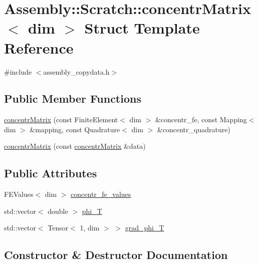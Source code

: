 \hypertarget{struct_assembly_1_1_scratch_1_1concentr_matrix}{}\section{Assembly\+:\+:Scratch\+:\+:concentr\+Matrix$<$ dim $>$ Struct Template Reference}
\label{struct_assembly_1_1_scratch_1_1concentr_matrix}


{\ttfamily \#include $<$assembly\+\_\+copydata.\+h$>$}

\subsection*{Public Member Functions}
\begin{DoxyCompactItemize}
\item 
\hyperlink{struct_assembly_1_1_scratch_1_1concentr_matrix_a09f4fe4a7e3f71ef4817e9a07b618473}{concentr\+Matrix} (const Finite\+Element$<$ dim $>$ \&concentr\+\_\+fe, const Mapping$<$ dim $>$ \&mapping, const Quadrature$<$ dim $>$ \&concentr\+\_\+quadrature)
\item 
\hyperlink{struct_assembly_1_1_scratch_1_1concentr_matrix_ae04f5cdc68467da262a5c29712790d24}{concentr\+Matrix} (const \hyperlink{struct_assembly_1_1_scratch_1_1concentr_matrix}{concentr\+Matrix} \&data)
\end{DoxyCompactItemize}
\subsection*{Public Attributes}
\begin{DoxyCompactItemize}
\item 
F\+E\+Values$<$ dim $>$ \hyperlink{struct_assembly_1_1_scratch_1_1concentr_matrix_ab33eea0fdd2716aa1aab80e22a3c3d1b}{concentr\+\_\+fe\+\_\+values}
\item 
std\+::vector$<$ double $>$ \hyperlink{struct_assembly_1_1_scratch_1_1concentr_matrix_a66a048dcc5601ac8bf72829c8a2eb567}{phi\+\_\+\+T}
\item 
std\+::vector$<$ Tensor$<$ 1, dim $>$ $>$ \hyperlink{struct_assembly_1_1_scratch_1_1concentr_matrix_a8a597e54b433d76d7e1f71b65b7155e5}{grad\+\_\+phi\+\_\+\+T}
\end{DoxyCompactItemize}


\subsection{Constructor \& Destructor Documentation}
\hypertarget{struct_assembly_1_1_scratch_1_1concentr_matrix_a09f4fe4a7e3f71ef4817e9a07b618473}{}
